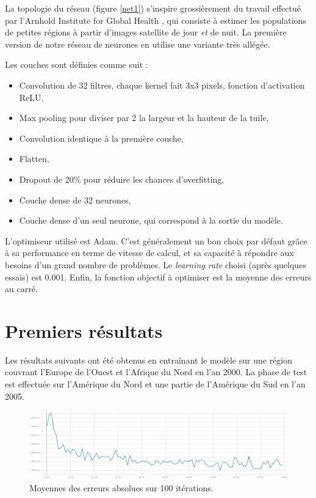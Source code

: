 \documentclass[a4paper, 11pt]{report}
\begin{document}
La topologie du réseau (figure \ref{net1}) s'inspire grossièrement du travail effectué par l'Arnhold Institute for Global Health \cite{netpop-article}, qui consiste à estimer les populations de petites régions à partir d'images satellite de jour \textit{et} de nuit. La première version de notre réseau de neurones en utilise une variante très allégée. 

Les couches sont définies comme suit :

\begin{itemize}
	\item Convolution de 32 filtres, chaque kernel fait 3x3 pixels, fonction d'activation ReLU,
	\item Max pooling pour diviser par 2 la largeur et la hauteur de la tuile,
	\item Convolution identique à la première couche,
	\item Flatten,
	\item Dropout de 20\% pour réduire les chances d'overfitting,
	\item Couche dense de 32 neurones,
	\item Couche dense d'un seul neurone, qui correspond à la sortie du modèle.
\end{itemize}

L'optimiseur utilisé est Adam. C'est généralement un bon choix par défaut grâce à sa performance en terme de vitesse de calcul, et sa capacité à répondre aux besoins d'un grand nombre de problèmes. Le \textit{learning rate} choisi (après quelques essais) est 0.001. Enfin, la fonction objectif à optimiser est la moyenne des erreurs au carré.

\section{Premiers résultats}

Les résultats suivants ont été obtenus en entraînant le modèle sur une région couvrant l'Europe de l'Ouest et l'Afrique du Nord en l'an 2000. La phase de test est effectuée sur l'Amérique du Nord et une partie de l'Amérique du Sud en l'an 2005.

\begin{figure}
	\centering
	\includegraphics[width=1.0\textwidth]{img/mae1.png}
	\caption{Moyennes des erreurs absolues sur 100 itérations.}
	\label{mae1}
\end{figure}
\end{document}
